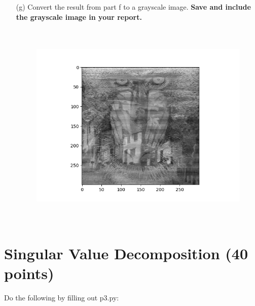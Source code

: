\documentclass[11pt,oneside,notitlepage]{article}
\begin{document}
\begin{itemize}
	
	\item[(g)]
	Convert the result from part f to a grayscale image. \textbf{Save and include the grayscale image in your report.}
    \begin{figure}[h]
    \begin{center}
        \includegraphics[height=10cm]{ps0_template/p2g.png}
    \end{center}
    \end{figure}
\end{itemize}
	
\section{Singular Value Decomposition (40 points)}
Do the following by filling out p3.py:
\end{document}
